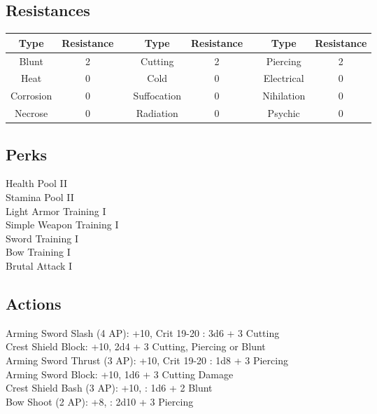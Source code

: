 \subsection{Resistances}
\begin{minipage}[H]{1\textwidth}
	\centering
	\begin{tabular}[c]{|c | c | c | c | c | c | c | c|}
		\hline
		Type & Resistance && Type & Resistance && Type & Resistance\\
		\hline
		Blunt & 2 &&
		Cutting & 2 &&
		Piercing & 2\\
		Heat & 0 &&
		Cold & 0 &&
		Electrical & 0\\
		Corrosion & 0 &&
		Suffocation & 0 &&
		Nihilation & 0 \\
		Necrose & 0 &&
		Radiation & 0 &&
		Psychic & 0\\
		\hline
	\end{tabular}
\end{minipage}

\subsection{Perks}
Health Pool II\\
Stamina Pool II\\
Light Armor Training I\\
Simple Weapon Training I\\
Sword Training I\\
Bow Training I\\
Brutal Attack I\\

\subsection{Actions}
Arming Sword Slash (4 AP): +10, Crit 19-20 : 3d6 + 3 Cutting\\

Crest Shield Block: +10, 2d4 + 3 Cutting, Piercing or Blunt\\

Arming Sword Thrust (3 AP): +10, Crit 19-20 : 1d8 + 3 Piercing\\

Arming Sword Block: +10, 1d6 + 3 Cutting Damage\\

Crest Shield Bash (3 AP): +10, : 1d6 + 2 Blunt\\

Bow Shoot (2 AP): +8, : 2d10 + 3 Piercing\\

